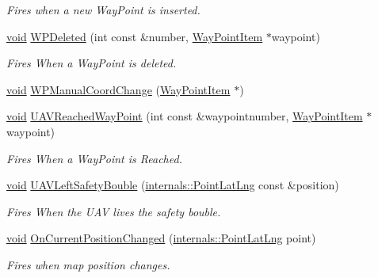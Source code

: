 \begin{DoxyCompactItemize}
\begin{DoxyCompactList}\small\item\em \-Fires when a new \-Way\-Point is inserted. \end{DoxyCompactList}\item 
\hyperlink{group___u_a_v_objects_plugin_ga444cf2ff3f0ecbe028adce838d373f5c}{void} \hyperlink{group___o_p_map_widget_ga27de44a330cf3ee63827db0c562f7bb8}{\-W\-P\-Deleted} (int const \&number, \hyperlink{classmapcontrol_1_1_way_point_item}{\-Way\-Point\-Item} $\ast$waypoint)
\begin{DoxyCompactList}\small\item\em \-Fires \-When a \-Way\-Point is deleted. \end{DoxyCompactList}\item 
\hyperlink{group___u_a_v_objects_plugin_ga444cf2ff3f0ecbe028adce838d373f5c}{void} \hyperlink{group___o_p_map_widget_gac6d662e318e008a70747a8d26b971a3a}{\-W\-P\-Manual\-Coord\-Change} (\hyperlink{classmapcontrol_1_1_way_point_item}{\-Way\-Point\-Item} $\ast$)
\item 
\hyperlink{group___u_a_v_objects_plugin_ga444cf2ff3f0ecbe028adce838d373f5c}{void} \hyperlink{group___o_p_map_widget_ga532ae30a356e865120c460f345a4ab65}{\-U\-A\-V\-Reached\-Way\-Point} (int const \&waypointnumber, \hyperlink{classmapcontrol_1_1_way_point_item}{\-Way\-Point\-Item} $\ast$waypoint)
\begin{DoxyCompactList}\small\item\em \-Fires \-When a \-Way\-Point is \-Reached. \end{DoxyCompactList}\item 
\hyperlink{group___u_a_v_objects_plugin_ga444cf2ff3f0ecbe028adce838d373f5c}{void} \hyperlink{group___o_p_map_widget_ga77cc2b980ecb442b256f8f494a8835c7}{\-U\-A\-V\-Left\-Safety\-Bouble} (\hyperlink{structinternals_1_1_point_lat_lng}{internals\-::\-Point\-Lat\-Lng} const \&position)
\begin{DoxyCompactList}\small\item\em \-Fires \-When the \-U\-A\-V lives the safety bouble. \end{DoxyCompactList}\item 
\hyperlink{group___u_a_v_objects_plugin_ga444cf2ff3f0ecbe028adce838d373f5c}{void} \hyperlink{group___o_p_map_widget_ga15064d97d2715398719dd78fccb07a39}{\-On\-Current\-Position\-Changed} (\hyperlink{structinternals_1_1_point_lat_lng}{internals\-::\-Point\-Lat\-Lng} point)
\begin{DoxyCompactList}\small\item\em \-Fires when map position changes. \end{DoxyCompactList}\item 

\end{DoxyCompactItemize}
